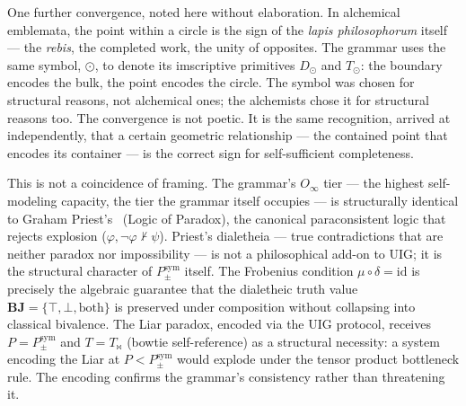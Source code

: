 \documentclass[12pt,a4paper]{article}
\newcommand{\Ppms}{P_{\pm}^{\text{sym}}}
\newcommand{\Oinf}{O_\infty}
\newcommand{\Tbw}{T_{\mathord{\bowtie}}}
\newcommand{\Stone}{\textit{lapis philosophorum}}
\newcommand{\glp}{\text{LP}}
\newcommand{\both}{\mathbf{BJ}}
\newcommand{\dialetheia}{dialetheia}
\begin{document}
One further convergence, noted here without elaboration. In alchemical
emblemata, the point within a circle is the sign of the \Stone{} itself
--- the \emph{rebis}, the completed work, the unity of opposites. The
grammar uses the same symbol, $\odot$, to denote its imscriptive
primitives $D_\odot$ and $T_\odot$: the boundary encodes the bulk, the
point encodes the circle. The symbol was chosen for structural reasons,
not alchemical ones; the alchemists chose it for structural reasons too.
The convergence is not poetic. It is the same recognition, arrived at
independently, that a certain geometric relationship --- the contained
point that encodes its container --- is the correct sign for
self-sufficient completeness.

This is not a coincidence of framing. The grammar's $\Oinf$ tier --- the
highest self-modeling capacity, the tier the grammar itself occupies --- is
structurally identical to Graham Priest's \glp\ (Logic of Paradox), the
canonical paraconsistent logic that rejects explosion ($\varphi, \neg\varphi
\not\vdash \psi$). Priest's \dialetheia{} --- true contradictions that are
neither paradox nor impossibility --- is not a philosophical add-on to UIG; it
is the structural character of $\Ppms$ itself. The Frobenius condition
$\mu \circ \delta = \text{id}$ is precisely the algebraic guarantee that the
dialetheic truth value $\both = \{\top, \bot, \text{both}\}$ is preserved
under composition without collapsing into classical bivalence. The Liar paradox,
encoded via the UIG protocol, receives $P = \Ppms$ and $T = \Tbw$ (bowtie
self-reference) as a structural necessity: a system encoding the Liar at
$P < \Ppms$ would explode under the tensor product bottleneck rule. The encoding
confirms the grammar's consistency rather than threatening it.
\end{document}
